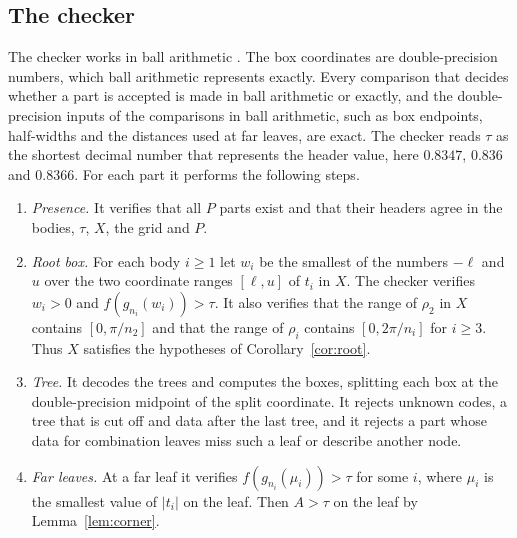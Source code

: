 \documentclass[11pt]{amsart}
\theoremstyle{definition}
\theoremstyle{remark}
\numberwithin{equation}{section}
\begin{document}
\subsection{The checker} The checker works in ball arithmetic \cite{Joh17}. The box coordinates are double-precision numbers, which ball arithmetic represents exactly. Every comparison that decides whether a part is accepted is made in ball arithmetic or exactly, and the double-precision inputs of the comparisons in ball arithmetic, such as box endpoints, half-widths and the distances used at far leaves, are exact. The checker reads $\tau$ as the shortest decimal number that represents the header value, here $0.8347$, $0.836$ and $0.8366$. For each part it performs the following steps.
\begin{enumerate}[label=(\arabic*),leftmargin=*]
\item\label{st:present} \emph{Presence.} It verifies that all $P$ parts exist and that their headers agree in the bodies, $\tau$, $X$, the grid and $P$.
\item\label{st:root} \emph{Root box.} For each body $i\ge1$ let $w_i$ be the smallest of the numbers $-\ell$ and $u$ over the two coordinate ranges $[\ell,u]$ of $t_i$ in $X$. The checker verifies $w_i>0$ and $f(g_{n_i}(w_i))>\tau$. It also verifies that the range of $\rho_2$ in $X$ contains $[0,\pi/n_2]$ and that the range of $\rho_i$ contains $[0,2\pi/n_i]$ for $i\ge3$. Thus $X$ satisfies the hypotheses of Corollary~\ref{cor:root}.
\item\label{st:tree} \emph{Tree.} It decodes the trees and computes the boxes, splitting each box at the double-precision midpoint of the split coordinate. It rejects unknown codes, a tree that is cut off and data after the last tree, and it rejects a part whose data for combination leaves miss such a leaf or describe another node.
\item\label{st:far} \emph{Far leaves.} At a far leaf it verifies $f(g_{n_i}(\mu_i))>\tau$ for some $i$, where $\mu_i$ is the smallest value of $|t_i|$ on the leaf. Then $A>\tau$ on the leaf by Lemma~\ref{lem:corner}.

\end{enumerate}
\end{document}
